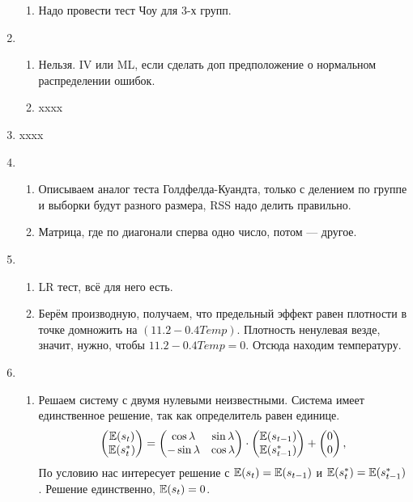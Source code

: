 \begin{enumerate}
\begin{enumerate}
            \item Надо провести тест Чоу для 3-х групп.
    \end{enumerate}

\item \begin{enumerate}
\item  Нельзя. IV или ML, если сделать доп предположение о нормальном распределении ошибок.
\item xxxx
\end{enumerate}
    
\item xxxx
\item \begin{enumerate}
    \item Описываем аналог теста Голдфелда-Куандта, только с делением по группе и выборки будут разного размера, 
    RSS надо делить правильно.
    
    \item Матрица, где по диагонали сперва одно число, потом — другое.
    
\end{enumerate}

\item \begin{enumerate}
    \item LR тест, всё для него есть.
    
    \item Берём производную, получаем, что предельный эффект равен плотности в точке домножить на $(11.2 - 0.4Temp)$. 
    Плотность ненулевая везде, значит, нужно, чтобы $11.2 - 0.4Temp=0$. Отсюда находим температуру.
    
\end{enumerate}

\item \begin{enumerate}
    \item Решаем систему с двумя нулевыми неизвестными. Система имеет единственное решение, так как определитель равен единице.
    \[
    \begin{pmatrix}
    \operatorname{\mathbb{E}}(s_t) \\
    \operatorname{\mathbb{E}}(s_t^*)
    \end{pmatrix} = 
    \begin{pmatrix}
    \cos \lambda & \sin \lambda \\
    -\sin \lambda & \cos \lambda \\
    \end{pmatrix} \cdot 
    \begin{pmatrix}
    \operatorname{\mathbb{E}}(s_{t-1}) \\
    \operatorname{\mathbb{E}}(s_{t-1}^*)
    \end{pmatrix} +
    \begin{pmatrix}
    0 \\
    0
    \end{pmatrix},   
    \]
    По условию нас интересует решение с $\operatorname{\mathbb{E}}(s_t) = \operatorname{\mathbb{E}}(s_{t-1})$ и $\operatorname{\mathbb{E}}(s_t^*) = \operatorname{\mathbb{E}}(s_{t-1}^*)$.
    Решение единственно, $\operatorname{\mathbb{E}}(s_t) =0$.


\end{enumerate}
\end{enumerate}
